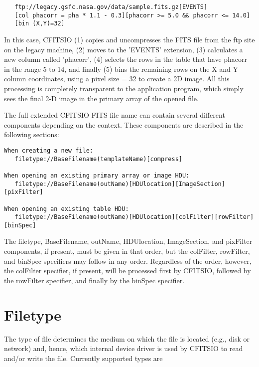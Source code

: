 \documentclass[11pt]{book}
\begin{document}
\begin{itemize}
\begin{verbatim}
   ftp://legacy.gsfc.nasa.gov/data/sample.fits.gz[EVENTS]
   [col phacorr = pha * 1.1 - 0.3][phacorr >= 5.0 && phacorr <= 14.0]
   [bin (X,Y)=32]
\end{verbatim}
In this case, CFITSIO (1) copies and uncompresses the FITS file from
the ftp site on the legacy machine, (2) moves to the 'EVENTS'
extension, (3) calculates a new column called 'phacorr', (4) selects
the rows in the table that have phacorr in the range 5 to 14, and
finally (5) bins the remaining rows on the X and Y column coordinates,
using a pixel size = 32 to create a 2D image.  All this processing is
completely transparent to the application program, which simply sees
the final 2-D image in the primary array of the opened file.
\end{itemize}

The full extended CFITSIO FITS file name can contain several different
components depending on the context.  These components are described in
the following sections:

\begin{verbatim}
When creating a new file:
   filetype://BaseFilename(templateName)[compress]

When opening an existing primary array or image HDU:
   filetype://BaseFilename(outName)[HDUlocation][ImageSection][pixFilter]

When opening an existing table HDU:
   filetype://BaseFilename(outName)[HDUlocation][colFilter][rowFilter][binSpec]
\end{verbatim}
The filetype, BaseFilename, outName, HDUlocation, ImageSection, and pixFilter
components, if present, must be given in that order, but the colFilter,
rowFilter, and binSpec specifiers may follow in any order.  Regardless
of the order, however, the colFilter specifier, if present, will be
processed first by CFITSIO, followed by the rowFilter specifier, and
finally by the binSpec specifier.


\section{Filetype}

The type of file determines the medium on which the file is located
(e.g., disk or network) and, hence, which internal device driver is used by
CFITSIO to read and/or write the file.  Currently supported types are
\end{document}
